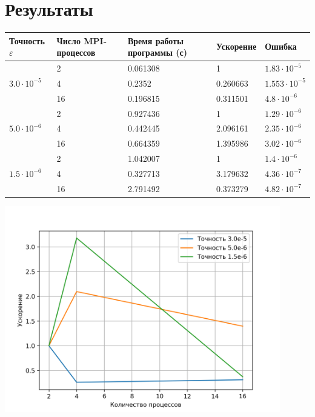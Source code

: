 \documentclass[12pt]{article}
\begin{document}
\section{Результаты}

\begin{center}
	\begin{tabular}{|l|l|l|l|l|}
		\hline
		Точность $\varepsilon$ &
		Число MPI-процессов &
		Время работы программы (с) &
		Ускорение &
		Ошибка \\
		\hline
		& 2 & 0.061308 & 1 & $1.83 \cdot 10^{-5}$ \\
		\cline{2-5}
		$3.0 \cdot 10^{-5}$
		& 4 & 0.2352 & 0.260663 & $1.553 \cdot 10^{-5}$ \\
		\cline{2-5}
		& 16 & 0.196815 & 0.311501 & $4.8 \cdot 10^{-6}$ \\

		\hline
		& 2 & 0.927436 & 1 & $1.29 \cdot 10^{-6}$ \\
		\cline{2-5}
		$5.0 \cdot 10^{-6}$
		& 4 & 0.442445 & 2.096161 & $2.35 \cdot 10^{-6}$ \\
		\cline{2-5}
		& 16 & 0.664359 & 1.395986 & $3.02 \cdot 10^{-6}$ \\

		\hline
		& 2 & 1.042007 & 1 & $1.4 \cdot 10^{-6}$ \\
		\cline{2-5}
		$1.5 \cdot 10^{-6}$
		& 4 & 0.327713 & 3.179632 & $4.36 \cdot 10^{-7}$ \\
		\cline{2-5}
		& 16 & 2.791492 & 0.373279 & $4.82 \cdot 10^{-7}$ \\
		\hline
	\end{tabular}

	\medskip

	\includegraphics[width=0.9\textwidth]{plot.png}
\end{center}
\end{document}
